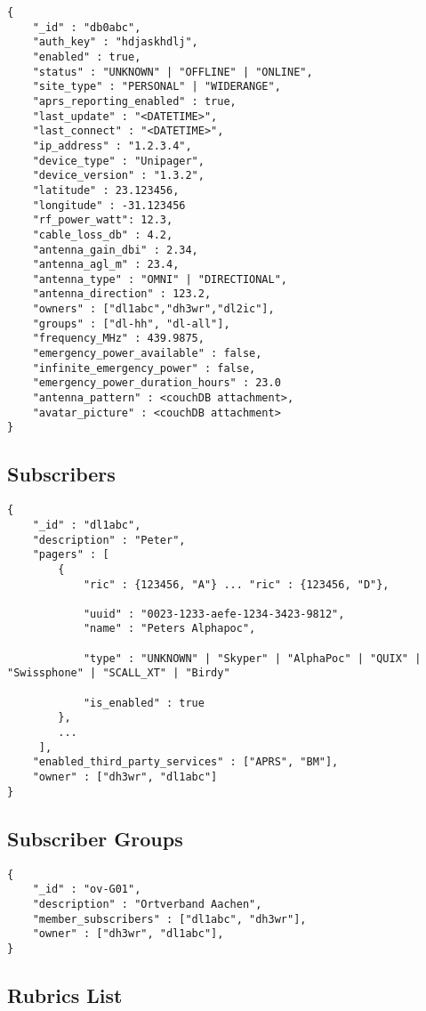 \begin{lstlisting}
{
	"_id" : "db0abc",
    "auth_key" : "hdjaskhdlj",
    "enabled" : true,
	"status" : "UNKNOWN" | "OFFLINE" | "ONLINE",
	"site_type" : "PERSONAL" | "WIDERANGE",
	"aprs_reporting_enabled" : true,
    "last_update" : "<DATETIME>",
	"last_connect" : "<DATETIME>",
    "ip_address" : "1.2.3.4",
    "device_type" : "Unipager",
    "device_version" : "1.3.2",
    "latitude" : 23.123456,
    "longitude" : -31.123456
    "rf_power_watt": 12.3,
    "cable_loss_db" : 4.2,
    "antenna_gain_dbi" : 2.34,
	"antenna_agl_m" : 23.4,
	"antenna_type" : "OMNI" | "DIRECTIONAL",
	"antenna_direction" : 123.2,
    "owners" : ["dl1abc","dh3wr","dl2ic"],
    "groups" : ["dl-hh", "dl-all"],
    "frequency_MHz" : 439.9875,
    "emergency_power_available" : false,
    "infinite_emergency_power" : false,
	"emergency_power_duration_hours" : 23.0        
    "antenna_pattern" : <couchDB attachment>,
    "avatar_picture" : <couchDB attachment>
}
\end{lstlisting}

 
\subsection{Subscribers}
\label{protocoldef:couchdb:subscribers}
\begin{lstlisting}
{
	"_id" : "dl1abc",
	"description" : "Peter",
	"pagers" : [
		{
    		"ric" : {123456, "A"} ... "ric" : {123456, "D"},

			"uuid" : "0023-1233-aefe-1234-3423-9812",
    		"name" : "Peters Alphapoc",

			"type" : "UNKNOWN" | "Skyper" | "AlphaPoc" | "QUIX" | "Swissphone" | "SCALL_XT" | "Birdy"

			"is_enabled" : true
     	},
     	...
     ],
    "enabled_third_party_services" : ["APRS", "BM"],
    "owner" : ["dh3wr", "dl1abc"]
}
\end{lstlisting}

\subsection{Subscriber Groups}

\begin{lstlisting}
{
	"_id" : "ov-G01",
	"description" : "Ortverband Aachen",
	"member_subscribers" : ["dl1abc", "dh3wr"],
    "owner" : ["dh3wr", "dl1abc"],
}
\end{lstlisting}

\subsection{Rubrics List}
\label{rubric_list}

